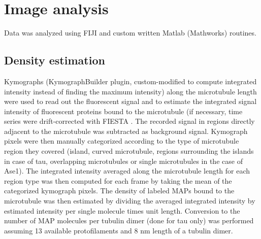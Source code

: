 \section{Image analysis}
\label{methods_analysis}
Data was analyzed using FIJI \parencite{Schindelin2012} and custom written Matlab (Mathworks) routines. 
\subsection{Density estimation}
Kymographs (KymographBuilder plugin, custom-modified to compute integrated intensity instead of finding the maximum intensity) along the microtubule length were used to read out the fluorescent signal and to estimate the integrated signal intensity of fluorescent proteins bound to the microtubule (if necessary, time series were drift-corrected with FIESTA \parencite{RUHNOW20112820}. The recorded signal in regions directly adjacent to the microtubule was subtracted as background signal. Kymograph pixels were then manually categorized according to the type of microtubule region they covered (island, curved microtubule, regions surrounding the islands in case of tau, overlapping microtubules or single microtubules in the case of Ase1). The integrated intensity averaged along the microtubule length for each region type was then computed for each frame by taking the mean of the categorized kymograph pixels. The density of labeled MAPs bound to the microtubule was then estimated by dividing the averaged integrated intensity by estimated intensity per single molecule times unit length. Conversion to the number of MAP molecules per tubulin dimer (done for tau only) was performed assuming 13 available protofilaments and 8 nm length of a tubulin dimer.

